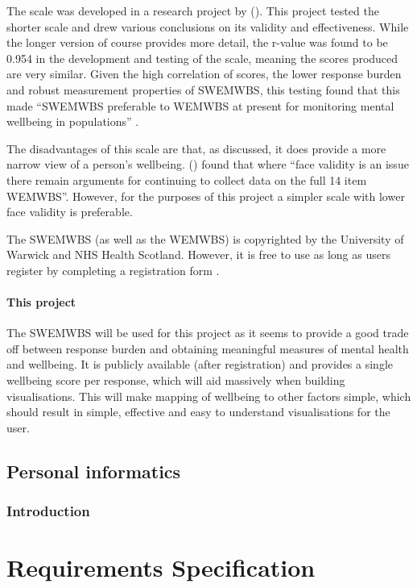 \documentclass[11pt,openright,a4paper]{report}
\begin{document}
The scale was developed in a research project by \citeauthor{stewart2009internal} (\citeyear{stewart2009internal}). This project tested the shorter scale and drew various conclusions on its validity and effectiveness. While the longer version of course provides more detail, the r-value was found to be 0.954 in the development and testing of the scale, meaning the scores produced are very similar. Given the high correlation of scores, the lower response burden and robust measurement properties of SWEMWBS, this testing found that this made \enquote{SWEMWBS preferable to WEMWBS at present for monitoring mental wellbeing in populations} \parencite{stewart2009internal}.

The disadvantages of this scale are that, as discussed, it does provide a more narrow view of a person's wellbeing. \citeauthor{stewart2009internal} (\citeyear{stewart2009internal}) found that where \enquote{face validity is an issue there remain arguments for continuing to collect data on the full 14 item WEMWBS}. However, for the purposes of this project a simpler scale with lower face validity is preferable.

The SWEMWBS (as well as the WEMWBS) is copyrighted by the University of Warwick and NHS Health Scotland. However, it is free to use as long as users register by completing a registration form \parencite{wemwbsreg}.

\subsubsection{This project}
The SWEMWBS will be used for this project as it seems to provide a good trade off between response burden and obtaining meaningful measures of mental health and wellbeing. It is publicly available (after registration) and provides a single wellbeing score per response, which will aid massively when building visualisations. This will make mapping of wellbeing to other factors simple, which should result in simple, effective and easy to understand visualisations for the user.

\section{Personal informatics} \label{personalinformatics}
\subsection{Introduction}


\chapter{Requirements Specification}
\end{document}
